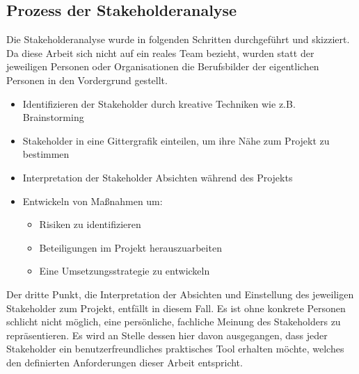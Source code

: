 \documentclass[pagesize, paper=a4, fontsize=12pt, titlepage=true, headings=small, headnosepline, abstractoff, liststotoc, nochapterprefix, plainheadsepline, twoside]{scrreprt}
\begin{document}
\subsection{Prozess der Stakeholderanalyse}
Die Stakeholderanalyse wurde in folgenden Schritten durchgeführt und skizziert. Da diese Arbeit sich nicht auf ein reales Team bezieht, wurden statt der jeweiligen Personen oder Organisationen die Berufsbilder der eigentlichen Personen in den Vordergrund gestellt.
\begin{itemize}
\item Identifizieren der Stakeholder durch kreative Techniken wie z.B. Brainstorming
\item Stakeholder in eine Gittergrafik einteilen, um ihre Nähe zum Projekt zu bestimmen
\item Interpretation der Stakeholder Absichten während des Projekts
\item Entwickeln von Maßnahmen um:
	\begin{itemize}
	\item Risiken zu identifizieren
	\item Beteiligungen im Projekt herauszuarbeiten
	\item Eine Umsetzungsstrategie zu entwickeln
	\end{itemize}
\end{itemize}

Der dritte Punkt, die Interpretation der Absichten und Einstellung des jeweiligen Stakeholder zum Projekt, entfällt in diesem Fall. Es ist ohne konkrete Personen schlicht nicht möglich, eine persönliche, fachliche Meinung des Stakeholders zu repräsentieren. Es wird an Stelle dessen hier davon ausgegangen, dass jeder Stakeholder ein benutzerfreundliches praktisches Tool erhalten möchte, welches den definierten Anforderungen dieser Arbeit entspricht.
\end{document}
